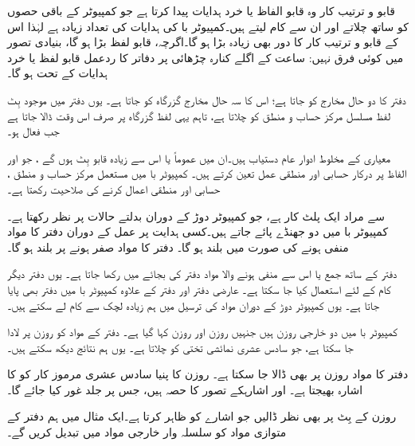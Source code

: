 قابو و ترتیب کار وہ قابو الفاظ یا خرد ہدایات پیدا کرتا ہے جو    کمپیوٹر  کے باقی حصوں کو  ساتھ چلاتے اور ان سے کام   لیتے ہیں۔کمپیوٹر با کی ہدایات کی تعداد زیادہ ہے لہٰذا  اس کے قابو و ترتیب کار  کا دور بھی زیادہ بڑا ہو گا۔اگرچہ، قابو لفظ بڑا ہو گا، بنیادی تصور میں کوئی فرق نہیں: ساعت کے اگلے کنارہ چڑھائی پر دفاتر کا ردعمل   قابو لفظ یا خرد ہدایات کے تحت ہو گا۔

دفتر  کا دو حال مخارج  کو جاتا ہے؛ اس کا سہ حال مخارج  گزرگاہ کو جاتا ہے۔ یوں دفتر  میں موجود  بِٹ لفظ مسلسل مرکز حساب و منطق کو چلاتا ہے، تاہم  یہی لفظ گزرگاہ پر صرف اس وقت  ڈالا جاتا ہے  جب  فعال ہو۔

معیاری      کے مخلوط ادوار عام دستیاب ہیں۔ان    میں عموماً  یا اس سے زیادہ  قابو بِٹ  ہوں گے ، جو   اور  الفاظ پر درکار حسابی اور منطقی عمل  تعین کرتے ہیں۔  کمپیوٹر با  میں مستعمل  مرکز حساب و منطق ، حسابی  اور منطقی اعمال کرنے کی صلاحیت رکھتا  ہے۔

 سے مراد    ایک   پلٹ کار  ہے، جو  کمپیوٹر دوڑ کے دوران بدلتے حالات   پر نظر رکھتا ہے۔ کمپیوٹر با میں دو جھنڈے پائے جاتے ہیں۔کسی ہدایت پر عمل کے دوران دفتر  کا مواد منفی ہونے  کی صورت میں   بلند ہو گا۔ دفتر  کا مواد صفر ہونے پر  بلند ہو گا۔

دفتر  کے ساتھ جمع  یا اس سے منفی ہونے والا مواد دفتر  کی بجائے میں رکھا جاتا ہے۔ یوں دفتر  دیگر کام کے لئے استعمال کیا جا سکتا ہے۔ عارضی دفتر اور دفتر  کے علاوہ کمپیوٹر با میں دفتر  بھی پایا جاتا ہے۔ یوں کمپیوٹر دوڑ کے دوران  مواد کی ترسیل میں ہم زیادہ لچک سے کام لے سکتے ہیں۔

کمپیوٹر  با میں دو خارجی روزن ہیں جنہیں روزن  اور روزن  کہا گیا ہے۔ دفتر  کے مواد کو روزن  پر لادا جا سکتا ہے،  جو سادس عشری نمائشی تختی کو چلاتا ہے۔ یوں ہم نتائج دیکھ سکتے ہیں۔

دفتر  کا مواد  روزن  پر بھی ڈالا جا سکتا ہے۔ روزن  کا پنیا  سادس عشری  مرموز کار کو  کا اشارہ  بھیجتا  ہے۔ اور   اشارہکے تصور کا حصہ ہیں، جس پر جلد غور کیا جائے گا۔

روزن  کے بِٹ  پر بھی نظر ڈالیں جو  اشارے کو ظاہر کرتا ہے۔ایک مثال میں ہم  دفتر  کے متوازی مواد کو سلسلہ وار خارجی مواد میں تبدیل کریں گے۔


